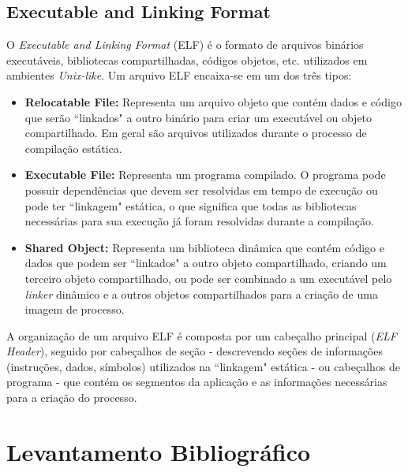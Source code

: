 \documentclass[11pt,twoside]{article}
\begin{document}
\subsection{Executable and Linking Format}

O \emph{Executable and Linking Format} (ELF) \cite{SCO1997} é o
formato de arquivos binários executáveis, bibliotecas compartilhadas,
códigos objetos, etc. utilizados em ambientes \textit{Unix-like}. Um
arquivo ELF encaixa-se em um dos três tipos:

\begin{itemize}
 	\item \textbf{Relocatable File:} Representa um arquivo objeto
          que contém dados e código que serão ``linkados" a outro
          binário para criar um executável ou objeto compartilhado. Em
          geral são arquivos utilizados durante o processo de
          compilação estática.
 
 	\item \textbf{Executable File:} Representa um programa
          compilado. O programa pode possuir dependências que devem
          ser resolvidas em tempo de execução ou pode ter ``linkagem"
          estática, o que significa que todas as bibliotecas
          necessárias para sua execução já foram resolvidas durante a
          compilação.
 
 	\item \textbf{Shared Object:} Representa um biblioteca
          dinâmica que contém código e dados que podem ser ``linkados"
          a outro objeto compartilhado, criando um terceiro objeto
          compartilhado, ou pode ser combinado a um executável pelo
          \textit{linker} dinâmico e a outros objetos compartilhados
          para a criação de uma imagem de processo.
\end{itemize}

A organização de um arquivo ELF é composta por um cabeçalho principal
(\emph{ELF Header}), seguido por cabeçalhos de seção - descrevendo
seções de informações (instruções, dados, símbolos) utilizados na
``linkagem" estática - ou cabeçalhos de programa - que contém os
segmentos da aplicação e as informações necessárias para a criação do
processo.







\section{Levantamento Bibliográfico}  \label{sec:bibliografia}
\end{document}
